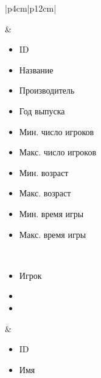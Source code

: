 \begin{table}[h!]
\begin{center}
\begin{threeparttable}
\begin{tabular}{|p{4cm}|p{12cm}|}
\begin{minipage}[t]{\linewidth}
\begin{multicols}{1}
\begin{itemize}[leftmargin=0mm,labelsep=0mm,nosep,after=\strut]
                \end{itemize}
              \end{multicols}
            \end{minipage}
          & \begin{minipage}[t]{\linewidth}
              \begin{multicols}{2}
                \begin{itemize}[leftmargin=0mm,labelsep=0mm,nosep,after=\strut]
                  \item[] ID
                  \item[] Название
                  \item[] Производитель
                  \item[] Год выпуска
                  \item[] Мин. число игроков
                  \item[] Макс. число игроков
                  \item[] Мин. возраст
                  \item[] Макс. возраст
                  \item[] Мин. время игры
                  \item[] Макс. время игры
                \end{itemize}
              \end{multicols}
            \end{minipage}\\
            \hline
            \begin{minipage}[t]{\linewidth}
              \begin{multicols}{1}
                \begin{itemize}[leftmargin=0mm,labelsep=0mm,nosep,after=\strut]
                  \item[] Игрок
                  \item[]
                  \item[]
                \end{itemize}
              \end{multicols}
            \end{minipage}
          & \begin{minipage}[t]{\linewidth}
              \begin{multicols}{2}
                \begin{itemize}[leftmargin=0mm,labelsep=0mm,nosep,after=\strut]
                  \item[] ID
                  \item[] Имя

\end{itemize}
\end{multicols}
\end{minipage}
\end{tabular}
\end{threeparttable}
\end{center}
\end{table}

